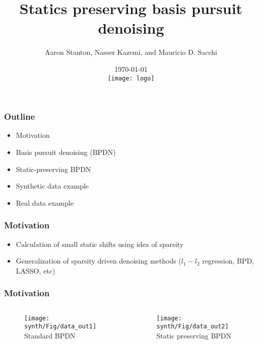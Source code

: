 \title[Short title]{Statics preserving basis pursuit denoising}
\author{\small Aaron Stanton, Nasser Kazemi, and Mauricio D. Sacchi}
\date{\small \today \\ \vspace{0.5cm} \texttt{[image: logo]}}


\maketitle

\begin{frame} \frametitle{Outline}
    \begin{itemize}
        \item Motivation
        \item Basis pursuit denoising (BPDN)
        \item Static-preserving BPDN
        \item Synthetic data example
        \item Real data example
    \end{itemize}
\end{frame}

\begin{frame} \frametitle{Motivation}
    \begin{itemize}
        \item Calculation of small static shifts using idea of sparsity
        \item Generalization of sparsity driven denoising methods ($l_1-l_2$ regression, BPD, LASSO, etc)
    \end{itemize}
\end{frame}

\begin{frame} \frametitle{Motivation}
\begin{columns}[c]
\column{2in} 
	\begin{center}
	\begin{figure} 
	\texttt{[image: synth/Fig/data\_out1]} \\ 
	\tiny Standard BPDN
	\end{figure} 
	\end{center}
\column{2in}
	\begin{center}
	\begin{figure} 
	\texttt{[image: synth/Fig/data\_out2]} \\
	\tiny Static preserving BPDN
	\end{figure}
	\end{center}
\end{columns}
\end{frame}


